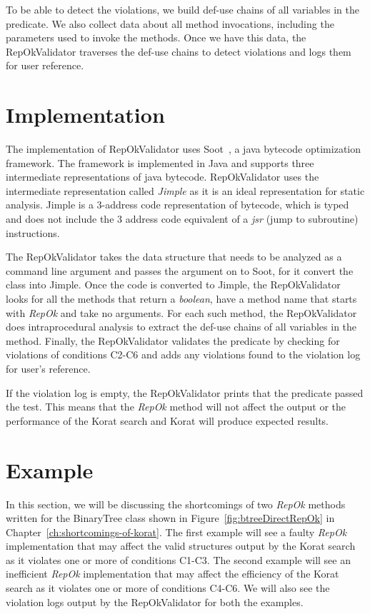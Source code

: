\para To be able to detect the violations, we build def-use chains of
all variables in the predicate. We also collect data about all method
invocations, including the parameters used to invoke the methods. Once
we have this data, the RepOkValidator traverses the def-use chains to
detect violations and logs them for user reference.

\section{Implementation}
\label{sec:implementation}
The implementation of RepOkValidator uses Soot~\cite{vallee1999soot}, a java
bytecode optimization framework. The framework is implemented in Java
and supports three intermediate representations of java
bytecode. RepOkValidator uses the intermediate representation called
\emph{Jimple} as it is an ideal representation for static analysis. Jimple is
a 3-address code representation of bytecode, which is typed and does
not include the 3 address code equivalent of a \emph{jsr} (jump to
subroutine) instructions.

\para The RepOkValidator takes the data structure that needs to be
analyzed as a command line argument and passes the argument on to
Soot, for it convert the class into Jimple. Once the code is converted
to Jimple, the RepOkValidator looks for all the methods that return a
\emph{boolean}, have a method name that starts with \emph{RepOk} and
take no arguments. For each such method, the RepOkValidator does
intraprocedural analysis to extract the def-use chains of all
variables in the method. Finally, the RepOkValidator validates the
predicate by checking for violations of conditions C2-C6 and adds any
violations found to the violation log for user’s reference.

\para If the violation log is empty, the RepOkValidator prints that
the predicate passed the test. This means that the \emph{RepOk} method
will not affect the output or the performance of the Korat search and
Korat will produce expected results.

\section{Example}
\label{sec:static-analysis-example}
In this section, we will be discussing the shortcomings of two
\emph{RepOk} methods written for the BinaryTree class shown in
Figure~\ref{fig:btreeDirectRepOk} in
Chapter~\ref{ch:shortcomings-of-korat}. The first example will see a
faulty \emph{RepOk} implementation that may affect the valid
structures output by the Korat search as it violates one or more of
conditions C1-C3. The second example will see an inefficient
\emph{RepOk} implementation that may affect the efficiency of the
Korat search as it violates one or more of conditions C4-C6. We will
also see the violation logs output by the RepOkValidator for both the
examples.


